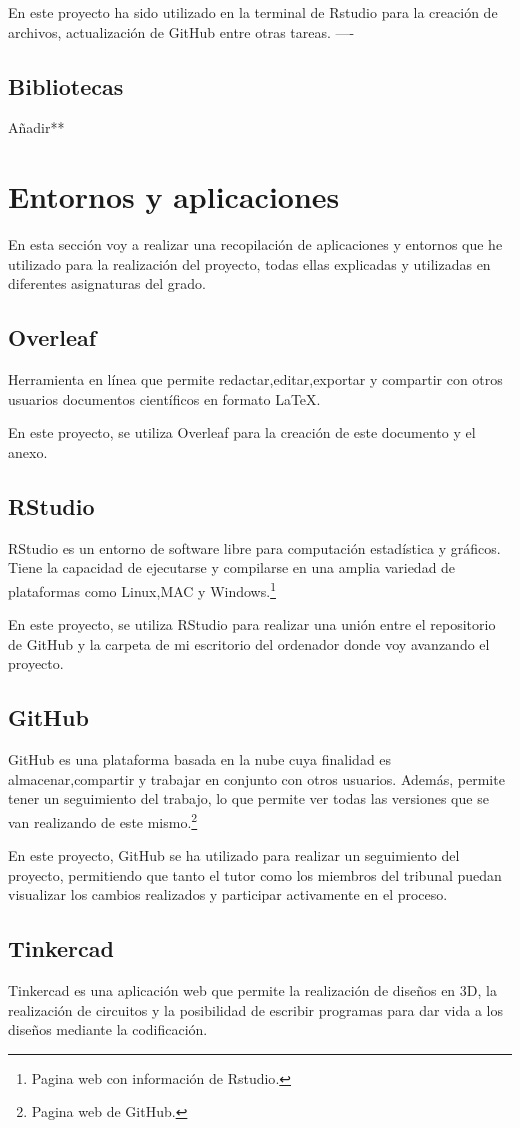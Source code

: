 En este proyecto ha sido utilizado en la terminal de Rstudio para la creación de archivos, actualización de GitHub entre otras tareas.
----
\subsection{Bibliotecas}
Añadir**
\section{Entornos y aplicaciones}
En esta sección voy a realizar una recopilación de aplicaciones y entornos que he utilizado para la realización del proyecto, todas ellas explicadas y utilizadas en diferentes asignaturas del grado.
\subsection{Overleaf}
Herramienta en línea que permite redactar,editar,exportar y compartir con otros usuarios documentos científicos en formato LaTeX.

En este proyecto, se utiliza Overleaf para la creación de este documento y el anexo.
\subsection{RStudio}
RStudio es un entorno de software libre para computación estadística y gráficos. Tiene la capacidad de ejecutarse y compilarse en una amplia variedad de plataformas como Linux,MAC y Windows.\cite{Rstudio}\footnote{Pagina web con información de Rstudio\cite{Rstudio}.}

En este proyecto, se utiliza RStudio para realizar una unión entre el repositorio de GitHub y la carpeta de mi escritorio del ordenador donde voy avanzando el proyecto.
\subsection{GitHub}
GitHub es una plataforma basada en la nube cuya finalidad es almacenar,compartir y trabajar en conjunto con otros usuarios. 
Además, permite tener un seguimiento del trabajo, lo que permite ver todas las versiones que se van realizando de este mismo.\cite{GitHub}\footnote{Pagina web de GitHub\cite{GitHub}.} 

En este proyecto, GitHub se ha utilizado para realizar un seguimiento del proyecto, permitiendo que tanto el tutor como los miembros del tribunal puedan visualizar los cambios realizados y participar activamente en el proceso.
\subsection{Tinkercad}
Tinkercad es una aplicación web que permite la realización de diseños en 3D, la realización de circuitos y la posibilidad de escribir programas para dar vida a los diseños mediante la codificación.


